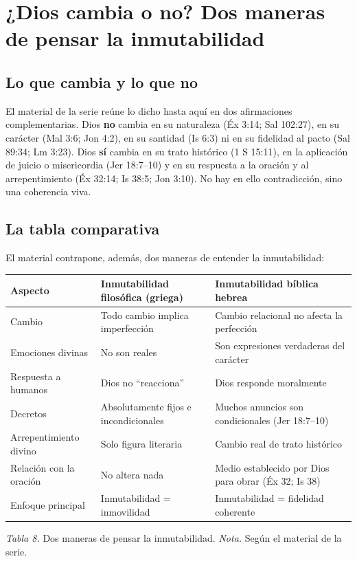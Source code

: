 \section{¿Dios cambia o no? Dos maneras de pensar la inmutabilidad}

\subsection{Lo que cambia y lo que no}
El material de la serie reúne lo dicho hasta aquí en dos afirmaciones complementarias. Dios \textbf{no} cambia en su naturaleza (Éx 3:14; Sal 102:27), en su carácter (Mal 3:6; Jon 4:2), en su santidad (Is 6:3) ni en su fidelidad al pacto (Sal 89:34; Lm 3:23). Dios \textbf{sí} cambia en su trato histórico (1 S 15:11), en la aplicación de juicio o misericordia (Jer 18:7--10) y en su respuesta a la oración y al arrepentimiento (Éx 32:14; Is 38:5; Jon 3:10). No hay en ello contradicción, sino una coherencia viva.

\subsection{La tabla comparativa}
El material contrapone, además, dos maneras de entender la inmutabilidad:

\begin{center}\small\renewcommand{\arraystretch}{1.18}
\begin{tabular}{@{}L{3.0cm}L{5.0cm}L{5.8cm}@{}}
\toprule
\textbf{Aspecto} & \textbf{Inmutabilidad filosófica (griega)} & \textbf{Inmutabilidad bíblica hebrea} \\ \midrule
Cambio & Todo cambio implica imperfección & Cambio relacional no afecta la perfección \\
Emociones divinas & No son reales & Son expresiones verdaderas del carácter \\
Respuesta a humanos & Dios no ``reacciona'' & Dios responde moralmente \\
Decretos & Absolutamente fijos e incondicionales & Muchos anuncios son condicionales (Jer 18:7--10) \\
Arrepentimiento divino & Solo figura literaria & Cambio real de trato histórico \\
Relación con la oración & No altera nada & Medio establecido por Dios para obrar (Éx 32; Is 38) \\
Enfoque principal & Inmutabilidad = inmovilidad & Inmutabilidad = fidelidad coherente \\
\bottomrule
\end{tabular}\par
{\footnotesize\color{gris}\textit{Tabla 8.} Dos maneras de pensar la inmutabilidad. \textit{Nota.} Según el material de la serie.}
\end{center}

